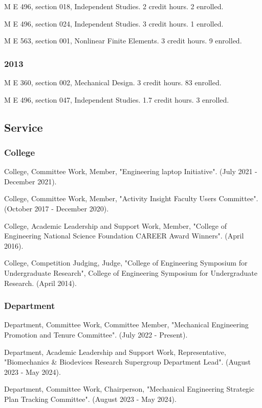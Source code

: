 \documentclass[
]{article}
\begin{document}
M E 496, section 018, Independent Studies. 2 credit hours. 2 enrolled.

M E 496, section 024, Independent Studies. 3 credit hours. 1 enrolled.

M E 563, section 001, Nonlinear Finite Elements. 3 credit hours. 9
enrolled.

\subsubsection{2013}\label{section-11}

M E 360, section 002, Mechanical Design. 3 credit hours. 83 enrolled.

M E 496, section 047, Independent Studies. 1.7 credit hours. 3 enrolled.

\subsection{Service}\label{service}

\subsubsection{College}\label{college}

College, Committee Work, Member, "Engineering laptop Initiative". (July
2021 - December 2021).

College, Committee Work, Member, "Activity Insight Faculty Users
Committee". (October 2017 - December 2020).

College, Academic Leadership and Support Work, Member, "College of
Engineering National Science Foundation CAREER Award Winners". (April
2016).

College, Competition Judging, Judge, "College of Engineering Symposium
for Undergraduate Research", College of Engineering Symposium for
Undergraduate Research. (April 2014).

\subsubsection{Department}\label{department}

Department, Committee Work, Committee Member, "Mechanical Engineering
Promotion and Tenure Committee". (July 2022 - Present).

Department, Academic Leadership and Support Work, Representative,
"Biomechanics \& Biodevices Research Supergroup Department Lead".
(August 2023 - May 2024).

Department, Committee Work, Chairperson, "Mechanical Engineering
Strategic Plan Tracking Committee". (August 2023 - May 2024).
\end{document}
